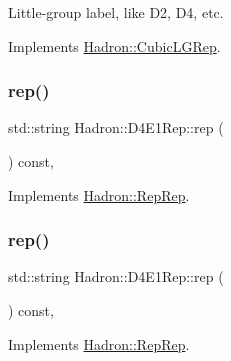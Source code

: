 Little-\/group label, like D2, D4, etc. 

Implements \mbox{\hyperlink{structHadron_1_1CubicLGRep_a9bdb14b519a611d21379ed96a3a9eb41}{Hadron\+::\+Cubic\+L\+G\+Rep}}.

\mbox{\label{structHadron_1_1D4E1Rep_add1afe88264c5adac1932f9880a6d980}} 
\subsubsection{\texorpdfstring{rep()}{rep()}\hspace{0.1cm}{\footnotesize\ttfamily [1/5]}}
{\footnotesize\ttfamily std\+::string Hadron\+::\+D4\+E1\+Rep\+::rep (\begin{DoxyParamCaption}{ }\end{DoxyParamCaption}) const\hspace{0.3cm}{\ttfamily [inline]}, {\ttfamily [virtual]}}



Implements \mbox{\hyperlink{structHadron_1_1RepRep_ab3213025f6de249f7095892109575fde}{Hadron\+::\+Rep\+Rep}}.

\mbox{\label{structHadron_1_1D4E1Rep_add1afe88264c5adac1932f9880a6d980}} 
\subsubsection{\texorpdfstring{rep()}{rep()}\hspace{0.1cm}{\footnotesize\ttfamily [2/5]}}
{\footnotesize\ttfamily std\+::string Hadron\+::\+D4\+E1\+Rep\+::rep (\begin{DoxyParamCaption}{ }\end{DoxyParamCaption}) const\hspace{0.3cm}{\ttfamily [inline]}, {\ttfamily [virtual]}}



Implements \mbox{\hyperlink{structHadron_1_1RepRep_ab3213025f6de249f7095892109575fde}{Hadron\+::\+Rep\+Rep}}.

\mbox{\label{structHadron_1_1D4E1Rep_add1afe88264c5adac1932f9880a6d980}} 
